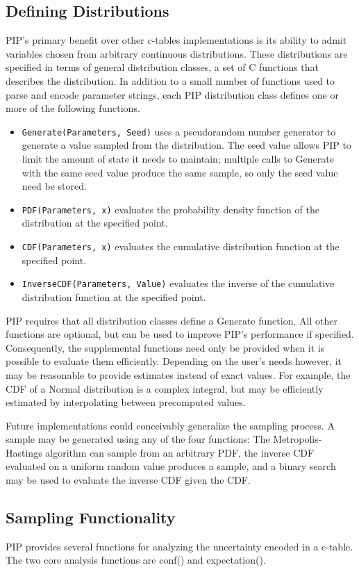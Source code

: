 \subsection{Defining Distributions}
PIP's primary benefit over other c-tables implementations is its ability to admit variables chosen from arbitrary continuous distributions.  These distributions are specified in terms of general distribution classes, a set of C functions that describes the distribution.  In addition to a small number of functions used to parse and encode parameter strings, each PIP distribution class defines one or more of the following functions.
\begin{itemize}
\item \texttt{Generate(Parameters, Seed)} uses a pseudorandom number generator to generate a value sampled from the distribution.  The seed value allows PIP to limit the amount of state it needs to maintain; multiple calls to Generate with the same seed value produce the same sample, so only the seed value need be stored.
\item \texttt{PDF(Parameters, x)} evaluates the probability density function of the distribution at the specified point.  
\item \texttt{CDF(Parameters, x)} evaluates the cumulative distribution function at the specified point.
\item \texttt{InverseCDF(Parameters, Value)} evaluates the inverse of the cumulative distribution function at the specified point.
\end{itemize}

PIP requires that all distribution classes define a Generate function.  All other functions are optional, but can be used to improve PIP's performance if specified.  Consequently, the supplemental functions need only be provided when it is possible to evaluate them efficiently.  Depending on the user's needs however, it may be reasonable to provide estimates instead of exact values.  For example, the CDF of a Normal distribution is a complex integral, but may be efficiently estimated by interpolating between precomputed values.  

Future implementations could conceivably generalize the sampling process.  A sample may be generated using any of the four functions: The Metropolis-Hastings algorithm can sample from an arbitrary PDF, the inverse CDF evaluated on a uniform random value produces a sample, and a binary search may be used to evaluate the inverse CDF given the CDF.

\subsection{Sampling Functionality}
PIP provides several functions for analyzing the uncertainty encoded in a c-table.  The two core analysis functions are conf() and expectation().


